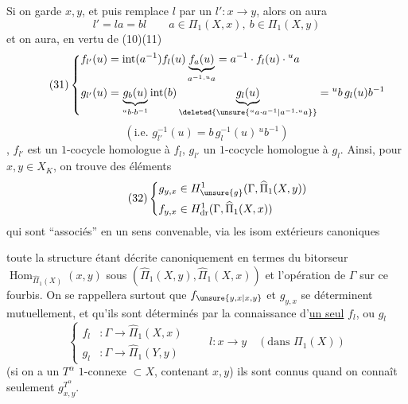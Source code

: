Si on garde $x,y$, et puis remplace $l$ par un $l':x\longrightarrow y$, alors  on aura
\[
l'=la=bl\qquad a\in\Pi_1(X,x),\ b\in\Pi_1(X,y)
\]
et on aura, en vertu de (10)(11)
\[
\tag{31}\left\{\begin{aligned}
f_{l'}(u)&=\operatorname{int}(a^{-1})f_l(u)\underbrace{f_a(u)}_{a^{-1}\cdot{}^ua}=a^{-1}\cdot f_l(u)\cdot{}^ua\\
g_{l'}(u)&=\underbrace{g_b(u)}_{{}^ub\cdot b^{-1}}\operatorname{int}(b)\underbrace{g_l(u)}_{\deleted{\unsure{{}^ua\cdot a^{-1}|a^{-1}\cdot{}^ua}}}={}^ub\,g_l(u)b^{-1}
\end{aligned}\right.
\]
\[
(\text{i.e. }g_{l'}^{-1}(u)=b\,g_l^{-1}(u)\,{}^ub^{-1})
\]
, $f_{l'}$ est un $1$-cocycle  homologue à $f_l$, $g_{l'}$ un $1$-cocycle  homologue à $g_l$. Ainsi, pour $x,y\in X_K$, on trouve des éléments
\[
\tag{32}\left\{\begin{aligned}
g_{y,x}&\in H^1_{\unsure{g}}(\Gamma,\widehat\Pi_1(X,y))\\
f_{y,x}&\in H^1_{\mathrm{dr}}(\Gamma,\widehat\Pi_1(X,x))
\end{aligned}\right.
\]
 qui sont ``associés'' en un sens convenable, via les isom extérieurs canoniques


toute la structure étant décrite canoniquement en termes du bitorseur $\operatorname{Hom}_{\widehat\Pi_1(X)}(x,y)$ sous $(\widehat\Pi_1(X,y),\widehat\Pi_1(X,x))$ et l'opération de $\Gamma$ sur  ce fourbis. On se rappellera surtout que $f_{\unsure{y,x|x,y}}$ et $g_{y,x}$ se déterminent mutuellement, et qu'ils sont déterminés par la connaissance d'\uline{un seul}   $f_l$, ou $g_l$
\[
\tag{33}\left\{\begin{aligned}
f_l&:\Gamma\longrightarrow\widehat\Pi_1(X,x)\\
g_l&:\Gamma\longrightarrow\widehat\Pi_1(Y,y)
\end{aligned}\right.
\qquad l:x\longrightarrow y\quad(\text{dans }\Pi_1(X))
\]
(si on a  un $T^\alpha$ $1$-connexe $\subset X$, contenant $x,y$) ils sont connus quand on connaît seulement $g^{T^\alpha}_{x,y}$.

